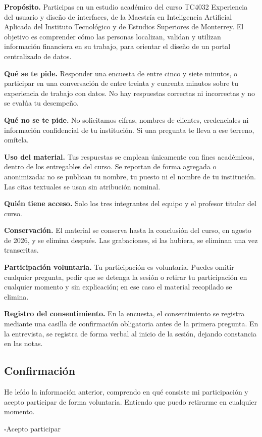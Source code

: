 \begin{uxdestacado}
\textbf{\textcolor{uxnavy}{Propósito.}} Participas en un estudio académico del curso TC4032
Experiencia del usuario y diseño de interfaces, de la Maestría en Inteligencia Artificial
Aplicada del Instituto Tecnológico y de Estudios Superiores de Monterrey. El objetivo es
comprender cómo las personas localizan, validan y utilizan información financiera en su
trabajo, para orientar el diseño de un portal centralizado de datos.

\textbf{\textcolor{uxnavy}{Qué se te pide.}} Responder una encuesta de entre cinco y siete
minutos, o participar en una conversación de entre treinta y cuarenta minutos sobre tu
experiencia de trabajo con datos. No hay respuestas correctas ni incorrectas y no se evalúa tu
desempeño.

\textbf{\textcolor{uxnavy}{Qué no se te pide.}} No solicitamos cifras, nombres de clientes,
credenciales ni información confidencial de tu institución. Si una pregunta te lleva a ese
terreno, omítela.

\textbf{\textcolor{uxnavy}{Uso del material.}} Tus respuestas se emplean únicamente con fines
académicos, dentro de los entregables del curso. Se reportan de forma agregada o anonimizada:
no se publican tu nombre, tu puesto ni el nombre de tu institución. Las citas textuales se
usan sin atribución nominal.

\textbf{\textcolor{uxnavy}{Quién tiene acceso.}} Solo los tres integrantes del equipo y el
profesor titular del curso.

\textbf{\textcolor{uxnavy}{Conservación.}} El material se conserva hasta la conclusión del
curso, en agosto de 2026, y se elimina después. Las grabaciones, si las hubiera, se eliminan
una vez transcritas.

\textbf{\textcolor{uxnavy}{Participación voluntaria.}} Tu participación es voluntaria. Puedes
omitir cualquier pregunta, pedir que se detenga la sesión o retirar tu participación en
cualquier momento y sin explicación; en ese caso el material recopilado se elimina.

\textbf{\textcolor{uxnavy}{Registro del consentimiento.}} En la encuesta, el consentimiento se
registra mediante una casilla de confirmación obligatoria antes de la primera pregunta. En la
entrevista, se registra de forma verbal al inicio de la sesión, dejando constancia en las
notas.
\end{uxdestacado}

\subsection{Confirmación}

\begin{uxnota}
He leído la información anterior, comprendo en qué consiste mi participación y acepto
participar de forma voluntaria. Entiendo que puedo retirarme en cualquier momento.

\vspace{6pt}
{\Large$\square$}\quad Acepto participar
\end{uxnota}

